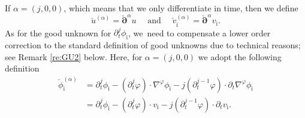 \documentclass[10pt]{amsart}
\newcommand{\dt}{\partial_t}
\newcommand{\cpalpha}{\check{\bm{\partial}}^{\alpha} }
\theoremstyle{definition}
\begin{document}
If $\alpha=(j,0,0)$, which means that we only differentiate in time, then we define
\[
\check{u}^{(\alpha)} = \cpalpha u
\quad\mbox{ and }\quad
\check{v}_\mathrm{i}^{(\alpha)} = \cpalpha v_\mathrm{i}.
\]
As for the good unknown for $\dt^j\phi_\mathrm{i}$, we~need to compensate a lower order correction to the standard definition of good unknowns due to technical reasons; see Remark \ref{re:GU2} below.
Here, for $\alpha=(j,0,0)$ we adopt the following definition
\begin{align*}
\check{\phi}_\mathrm{i}^{(\alpha)}
&= \dt^j \phi_\mathrm{i}-(\dt^j\varphi)\cdot\nabla^\varphi\phi_\mathrm{i}-j(\dt^{j-1}\varphi)\cdot\dt\nabla^\varphi\phi_\mathrm{i} \\
&= \dt^j \phi_\mathrm{i}-(\dt^j\varphi)\cdot v_\mathrm{i}-j(\dt^{j-1}\varphi)\cdot\dt v_\mathrm{i}.
\end{align*}
\end{document}
